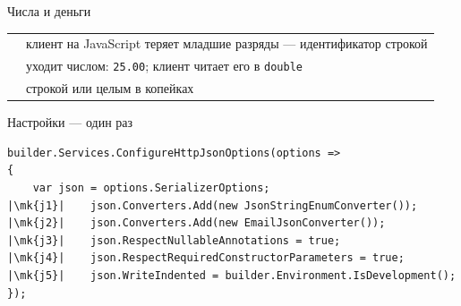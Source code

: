 \documentclass[aspectratio=169,10pt,t]{beamer}
\newcommand{\codesm}{\ttfamily\fontsize{7.6}{9.0}\selectfont}
\newcommand{\mk}[1]{\tikz[remember picture,overlay]\coordinate (#1) at (0,0.55ex);}
\begin{document}
\begin{frame}{Числа и деньги}
  \slidetop

  {\renewcommand{\arraystretch}{1.6}
  \begin{tabular}{@{}L{4.4cm}L{8.4cm}@{}}
          & клиент на JavaScript теряет младшие разряды
      --- идентификатор строкой \\
         & уходит числом: \texttt{25.00}; клиент читает
      его в \texttt{double} \\
                   & строкой или целым в копейках \\
  \end{tabular}}

  \slidegap
\end{frame}

\begin{frame}[fragile]{Настройки --- один раз}
  \slidetop

\begin{lstlisting}[style=csharp,basicstyle=\codesm,escapechar=|]
builder.Services.ConfigureHttpJsonOptions(options =>
{
    var json = options.SerializerOptions;
|\mk{j1}|    json.Converters.Add(new JsonStringEnumConverter());
|\mk{j2}|    json.Converters.Add(new EmailJsonConverter());
|\mk{j3}|    json.RespectNullableAnnotations = true;
|\mk{j4}|    json.RespectRequiredConstructorParameters = true;
|\mk{j5}|    json.WriteIndented = builder.Environment.IsDevelopment();
});
\end{lstlisting}

  \slidegap
\end{frame}
\end{document}
